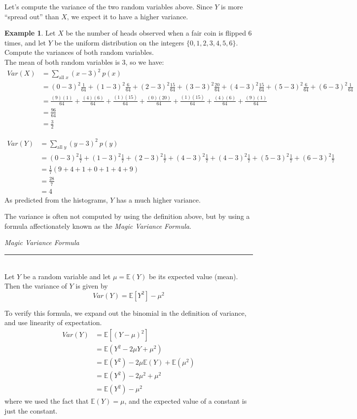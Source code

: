 \documentclass[12pt]{article}
\theoremstyle{definition}
\newtheorem*{example}{Example}
\theoremstyle{remark}
\def\E{{\mathbb E}}
\begin{document}
Let's compute the variance of the two random variables above. Since $Y$ is more ``spread out'' than $X$, we expect it to have a higher variance.

\begin{example}Let $X$ be the number of heads observed when a fair coin is flipped 6 times, and let $Y$ be the uniform distribution on the integers $\{0, 1, 2, 3, 4, 5, 6\}$. Compute the variances of both random variables.\\

The mean of both random variables is 3, so we have:
\begin{align*}
Var(X) &= \sum_{\text{all }x}(x - 3)^2 \:p(x) \\
&= (0-3)^2 \frac{1}{64} + (1-3)^2 \frac{6}{64} + (2-3)^2 \frac{15}{64} + (3-3)^2 \frac{20}{64} + (4-3)^2 \frac{15}{64} + (5-3)^2 \frac{6}{64} + (6-3)^2 \frac{1}{64} \\
&= \frac{(9)(1)}{64} + \frac{(4)(6)}{64} + \frac{(1)(15)}{64} + \frac{(0)(20)}{64} + \frac{(1)(15)}{64} + \frac{(4)(6)}{64} + \frac{(9)(1)}{64} \\ 
&= \frac{96}{64} \\
&= \frac{3}{2}
\end{align*}

\begin{align*}
Var(Y) &= \sum_{\text{all }y}(y - 3)^2 \:p(y) \\
&= (0-3)^2 \frac{1}{7} + (1-3)^2 \frac{1}{7} + (2-3)^2 \frac{1}{7} + (4-3)^2 \frac{1}{7} + (4-3)^2 \frac{1}{7} + (5-3)^2 \frac{1}{7} + (6-3)^2 \frac{1}{7} \\
&= \frac{1}{7}(9 + 4 + 1 + 0 + 1 + 4 + 9) \\
&= \frac{28}{7} \\
&= 4
\end{align*}
As predicted from the histograms, $Y$ has a much higher variance.
\end{example}

The variance is often not computed by using the definition above, but by using a formula affectionately known as the \emph{Magic Variance Formula}.

\begin{framed}
  \emph{Magic Variance Formula}\\
  \rule{\dimexpr{}\fboxrule}{.1pt} \\
Let $Y$ be a random variable and let $\mu = \E(Y)$ be its expected value (mean). Then the variance of $Y$ is given by
\[
Var(Y) = \E[ Y^2 ] - \mu^2
\]
\end{framed}
To verify this formula, we expand out the binomial in the definition of variance, and use linearity of expectation.
\begin{align*}
Var(Y) &= \E[ (Y - \mu)^2] \\
&= \E( Y^2 - 2 \mu Y + \mu^2 ) \\
&= \E(Y^2) - 2 \mu \E(Y) + \E(\mu^2) \\
&= \E(Y^2) - 2 \mu^2 + \mu^2 \\
&= \E(Y^2) - \mu^2
\end{align*}
where we used the fact that $\E(Y) = \mu$, and the expected value of a constant is just the constant.\\
\end{document}
